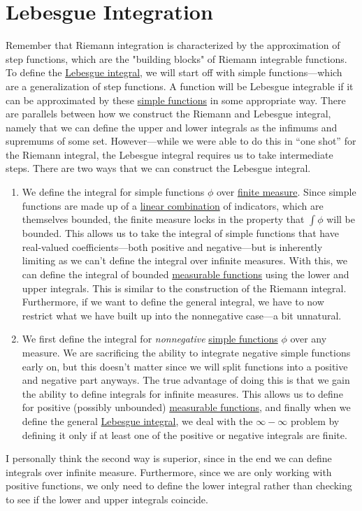 \section{Lebesgue Integration}

  Remember that Riemann integration is characterized by the approximation of step functions, which are the "building blocks" of Riemann integrable functions. To define the \hyperref[def:leb-int-signed]{Lebesgue integral}, we will start off with simple functions---which are a generalization of step functions. A function will be Lebesgue integrable if it can be approximated by these \hyperref[def:simple-functions]{simple functions} in some appropriate way. There are parallels between how we construct the Riemann and Lebesgue integral, namely that we can define the upper and lower integrals as the infimums and supremums of some set. However---while we were able to do this in ``one shot'' for the Riemann integral, the Lebesgue integral requires us to take intermediate steps. There are two ways that we can construct the Lebesgue integral. 
  \begin{enumerate}
    \item We define the integral for simple functions $\phi$ over \hyperref[def:finite-measure]{finite measure}. Since simple functions are made up of a \hyperref[lin-def:linear-combination]{linear combination} of indicators, which are themselves bounded, the finite measure locks in the property that $\int \phi$ will be bounded. This allows us to take the integral of simple functions that have real-valued coefficients---both positive and negative---but is inherently limiting as we can't define the integral over infinite measures. With this, we can define the integral of bounded \hyperref[def:measurable-function]{measurable functions} using the lower and upper integrals. This is similar to the construction of the Riemann integral. Furthermore, if we want to define the general integral, we have to now restrict what we have built up into the nonnegative case---a bit unnatural. 

    \item We first define the integral for \textit{nonnegative} \hyperref[def:simple-functions]{simple functions} $\phi$ over any measure. We are sacrificing the ability to integrate negative simple functions early on, but this doesn't matter since we will split functions into a positive and negative part anyways. The true advantage of doing this is that we gain the ability to define integrals for infinite measures. This allows us to define for positive (possibly unbounded) \hyperref[def:measurable-function]{measurable functions}, and finally when we define the general \hyperref[def:leb-int-signed]{Lebesgue integral}, we deal with the $\infty - \infty$ problem by defining it only if at least one of the positive or negative integrals are finite. 
  \end{enumerate}
  I personally think the second way is superior, since in the end we can define integrals over infinite measure. Furthermore, since we are only working with positive functions, we only need to define the lower integral rather than checking to see if the lower and upper integrals coincide. 

